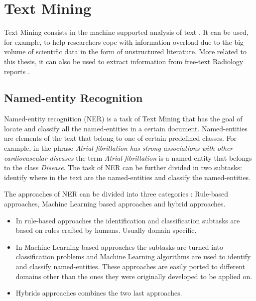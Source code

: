 \label{chap2}


\section{Text Mining}

Text Mining consists in the machine supported analysis of text \citep{Hotho2005}. It can be used, for example, to help researchers cope with information overload \citep{Cohen2005a} due to the big volume of scientific data in the form of unstructured literature. More related to this thesis, it can also be used to extract information from free-text Radiology reports \citep{Pons2016}.

\subsection{Named-entity Recognition}
\label{Named-entity Recognition}

Named-entity recognition (NER) is a task of Text Mining that has the goal of locate and classify all the named-entities in a certain document. Named-entities are elements of the text that belong to one of certain predefined classes. For example, in the phrase \textit{Atrial fibrillation has strong associations with other cardiovascular diseases} the term \textit{Atrial fibrillation} is a named-entity that belongs to the class \textit{Disease}. The task of NER can be further divided in two subtasks: identify where in the text are the named-entities and classify the named-entities.

The approaches of NER can be divided into three categories \citep{Mansouri2008}: Rule-based approaches, Machine Learning based approaches and hybrid approaches.

\begin{itemize}
\item In rule-based approaches the identification and classification subtasks are based on rules crafted by humans. Usually domain specific.
\item In Machine Learning based approaches the subtasks are turned into classification problems and Machine Learning algorithms are used to identify and classify named-entities. These approaches are easily ported to different domains other than the ones they were originally developed to be applied on.
\item Hybrids approaches combines the two last approaches.
\end{itemize}

